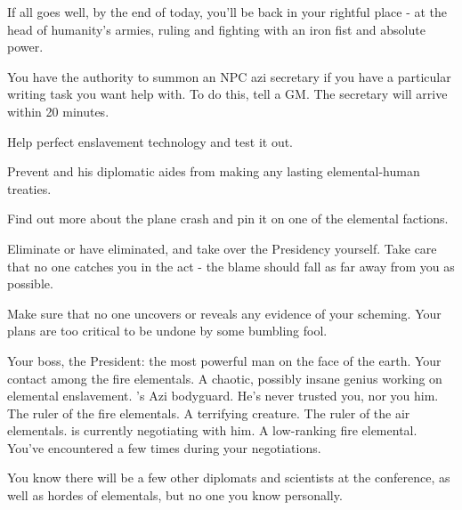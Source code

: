 \documentclass[char]{elementals}
\begin{document}
If all goes well, by the end of today, you'll be back in your rightful place - at the head of humanity's armies, ruling and fighting with an iron fist and absolute power. 

\begin{itemz}[Notes]
	\item  You have the authority to summon an NPC azi secretary if you have a particular writing task you want help with. To do this, tell a GM. The secretary will arrive within 20 minutes.
\end{itemz}

\begin{itemz}[Goals]
	\item  Help \cMS{} perfect \cMS{\their} enslavement technology and test it out.
	\item  Prevent \cLeader{} and his diplomatic aides from making any lasting elemental-human treaties.
	\item  Find out more about the plane crash and pin it on one of the elemental factions.
	\item  Eliminate \cLeader{} or have \cLeader{\them} eliminated, and take over the Presidency yourself. Take care that no one catches you in the act - the blame should fall as far away from you as possible.
	\item  Make sure that no one uncovers or reveals any evidence of your scheming. Your plans are too critical to be undone by some bumbling fool.
\end{itemz}

\begin{contacts}
	\contact{\cLeader{}}  Your boss, the President: the most powerful man on the face of the earth.
	\contact{\cPyro{}}  Your contact among the fire elementals.
	\contact{\cMS{}}  A chaotic, possibly insane genius working on elemental enslavement.
	\contact{\cRomeo{}}  \cLeader{}'s Azi bodyguard. He's never trusted you, nor you him.
	\contact{\cQueen{}}  The ruler of the fire elementals. A terrifying creature.
	\contact{\cKing{}}  The ruler of the air elementals. \cLeader{} is currently negotiating with him.
  \contact{\cJuliet{}} A low-ranking fire elemental. You've encountered \cJuliet{\them} a few times during your negotiations.
\end{contacts}
You know there will be a few other diplomats and scientists at the conference, as well as hordes of elementals, but no one you know personally.
\end{document}
